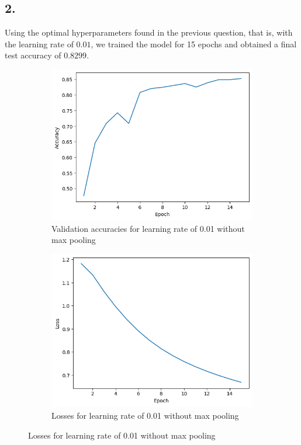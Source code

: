 \documentclass[11pt]{article}
\begin{document}
\subsection*{2.}

Using the optimal hyperparameters found in the previous question, that is, with the learning rate of $0.01$, we trained the model for 15 epochs and obtained a final test accuracy of $0.8299$.

\begin{figure}[H]
    \hspace{0.025\linewidth}
    \begin{subfigure}{0.45\linewidth}
        \centering
        \includegraphics[width=\linewidth]{../data/q2/2/0.01.acc.png}
        \caption{Validation accuracies for learning rate of 0.01 without max pooling}
    \end{subfigure}
    \hspace{0.05\linewidth}
    \begin{subfigure}{0.45\linewidth}
        \centering
        \includegraphics[width=\linewidth]{../data/q2/2/0.01.loss.png}
        \caption{Losses for learning rate of 0.01 without max pooling}
    \end{subfigure}
\end{figure}
\end{document}
